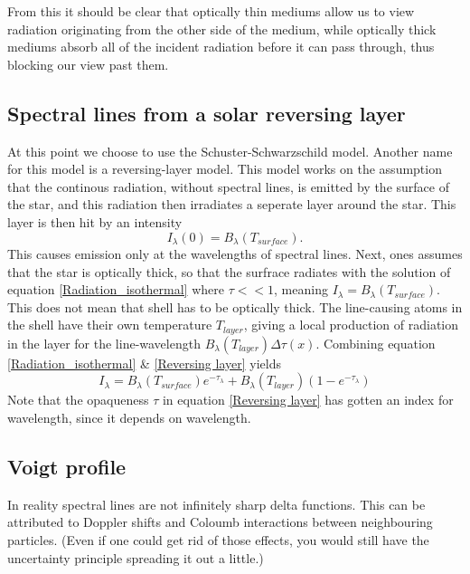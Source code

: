 \documentclass{aa}   %
\begin{document}
From this it should be clear that optically thin mediums allow us to view radiation originating from the other side of the medium, while optically thick mediums absorb all of the incident radiation before it can pass through, thus blocking our view past them.

\subsection{Spectral lines from a solar reversing layer}
At this point we choose to use the Schuster-Schwarzschild model. Another name for this model is a reversing-layer model.
This model works on the assumption that the continous radiation, without spectral lines, is emitted by the surface of the star, and this radiation then irradiates a seperate layer around the star.
This layer is then hit by an intensity
\begin{equation}
 I_\lambda(0) = B_\lambda(T_{surface}).
\end{equation}\label{Surface layer}
This causes emission only at the wavelengths of spectral lines. 
Next, ones assumes that the star is optically thick, so that the surfrace radiates with the solution of equation \ref{Radiation_isothermal} where $\tau << 1$, meaning $I_\lambda = B_\lambda(T_{surface})$. This does not mean that shell has to be optically thick. The line-causing atoms in the shell have their own temperature $T_{layer}$, giving a local production of radiation in the layer for the line-wavelength $B_\lambda(T_{layer})\Delta\tau(x)$. Combining equation \ref{Radiation_isothermal} \& \ref{Reversing layer} yields
\begin{equation}
 I_\lambda =B_\lambda(T_{surface})e^{-\tau_\lambda} + B_\lambda(T_{layer})(1 - e^{-\tau_\lambda})
\end{equation}\label{Reversing layer}
Note that the opaqueness $\tau$ in equation \ref{Reversing layer} has gotten an index for wavelength, since it depends on wavelength.

\subsection{Voigt profile}
In reality spectral lines are not infinitely sharp delta functions. This can be attributed to Doppler shifts and Coloumb interactions between neighbouring particles. (Even if one could get rid of those effects, you would still have the uncertainty principle spreading it out a little.)
\end{document}
